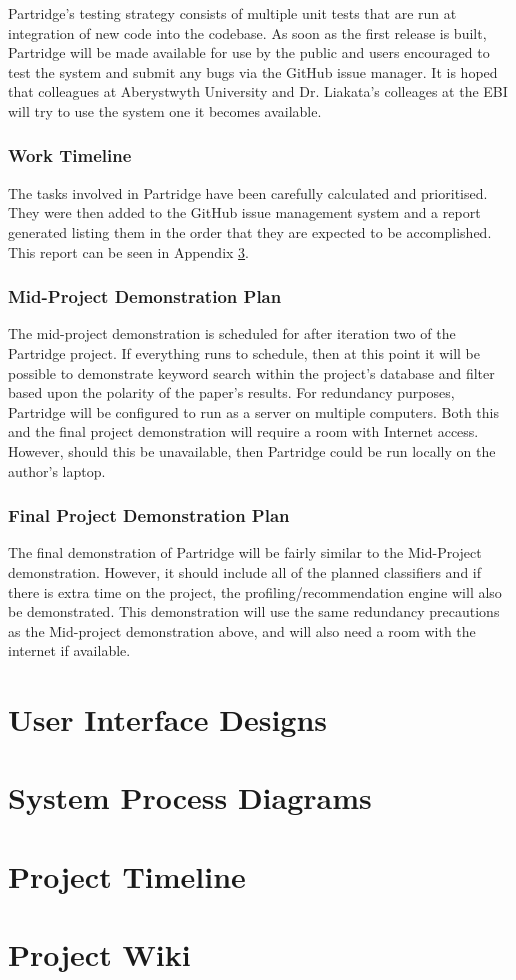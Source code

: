 \documentclass[12pt,a4paper]{article}
\begin{document}
Partridge's testing strategy consists of multiple unit tests that are run at
integration of new code into the codebase. As soon as the first release is
built, Partridge will be made available for use by the public and users
encouraged to test the system and submit any bugs via the GitHub issue manager.
It is hoped that colleagues at Aberystwyth University and Dr. Liakata's
colleages at the EBI will try to use the system one it becomes available.

\subsubsection{ Work Timeline }

The tasks involved in Partridge have been carefully calculated and prioritised.
They were then added to the GitHub issue management system and a report
generated listing them in the order that they are expected to be
accomplished. This report can be seen in Appendix \ref{sec:timeline}. 


\subsubsection{ Mid-Project Demonstration Plan}

The mid-project demonstration is scheduled for after iteration two of the
Partridge project. If everything runs to schedule, then at this point it will
be possible to demonstrate keyword search within the project's database and
filter based upon the polarity of the paper's results. For redundancy purposes,
Partridge will be configured to run as a server on multiple computers. Both
this and the final project demonstration will require a room with Internet
access. However, should this be unavailable, then Partridge could be run
locally on the author's laptop.

\subsubsection{ Final Project Demonstration Plan}

The final demonstration of Partridge will be fairly similar to the Mid-Project
demonstration. However, it should include all of the planned classifiers and if
there is extra time on the project, the profiling/recommendation engine will
also be demonstrated. This demonstration will use the same redundancy
precautions as the Mid-project demonstration above, and will also need a room
with the internet if available.

\appendix
\section{User Interface Designs}
\label{sec:ui_designs}

\section{System Process Diagrams}
\label{sec:system_diagrams}


\section{Project Timeline}
\label{sec:timeline}

\section{Project Wiki}
\label{sec:wiki}




\end{document}

